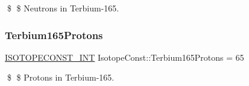 \$ \$ Neutrons in Terbium-\/165. \mbox{\label{group___isotope_const-_terbium-_tb165_gad17fc1058df0655abb92aec31d097577}} 
\subsubsection{\texorpdfstring{Terbium165\+Protons}{Terbium165Protons}}
{\footnotesize\ttfamily \mbox{\hyperlink{group___isotope_const-_macros_ga5f18360b3e99483a35c32d789e62621c}{I\+S\+O\+T\+O\+P\+E\+C\+O\+N\+S\+T\+\_\+\+I\+NT}} Isotope\+Const\+::\+Terbium165\+Protons = 65}

\$ \$ Protons in Terbium-\/165. 